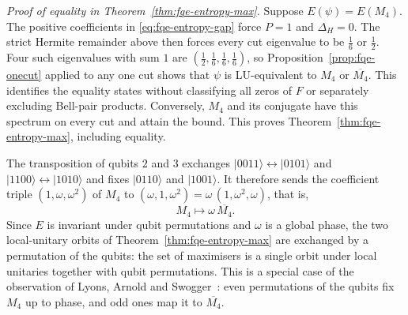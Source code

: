\emph{Proof of equality in Theorem~\ref{thm:fqe-entropy-max}.} Suppose $E(\psi)=E(M_4)$. The
positive coefficients in \eqref{eq:fqe-entropy-gap} force $P=1$ and $\Delta_H=0$.
The strict Hermite remainder above then forces every cut eigenvalue to be
$\tfrac16$ or $\tfrac12$. Four such eigenvalues with sum $1$ are
$(\tfrac12,\tfrac16,\tfrac16,\tfrac16)$, so Proposition~\ref{prop:fqe-onecut} applied to any one cut
shows that $\psi$ is LU-equivalent to $M_4$ or $\overline{M_4}$. This identifies the equality states without classifying all zeros
of $F$ or separately excluding Bell-pair products. Conversely, $M_4$ and its conjugate
have this spectrum on every cut and attain the bound. This proves Theorem~\ref{thm:fqe-entropy-max},
including equality.

\begin{remark}\label{rem:fqe-single-orbit} The transposition of qubits $2$ and $3$
exchanges $|0011\rangle\leftrightarrow|0101\rangle$ and $|1100\rangle\leftrightarrow|1010\rangle$ and
fixes $|0110\rangle$ and $|1001\rangle$. It therefore sends the coefficient triple
$(1,\omega,\omega^2)$ of $M_4$ to $(\omega,1,\omega^2)=\omega\,(1,\omega^2,\omega)$, that is,
\[
M_4\longmapsto\omega\,\overline{M_4}.
\]
Since $E$ is invariant under qubit
permutations and $\omega$ is a global phase, the two local-unitary orbits of
Theorem~\ref{thm:fqe-entropy-max} are exchanged by a permutation of the qubits: the set of maximisers
is a single orbit under local unitaries together with qubit permutations. This is a special case of
the observation of Lyons, Arnold and Swogger~\cite{LAS}: even permutations of the qubits fix $M_4$ up to
phase, and odd ones map it to $\overline{M_4}$.
\end{remark}
